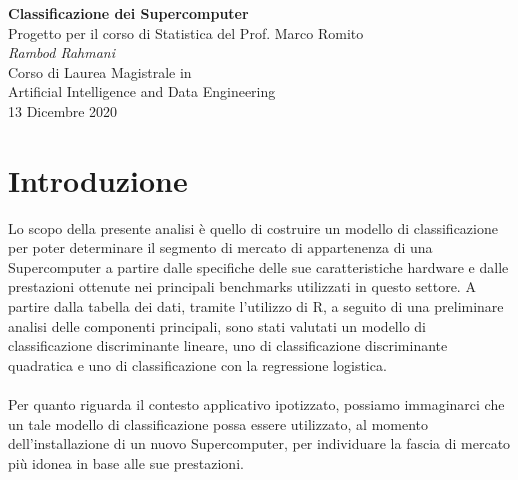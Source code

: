 \documentclass[11pt,a4paper]{article}
\begin{document}
\begin{center}
	\Large\textbf{Classificazione dei Supercomputer}\\
	\vspace{0.2cm}
	\large{Progetto per il corso di Statistica del Prof. Marco Romito}\\
	\vspace{0.5cm}
	\large\textit{Rambod Rahmani}\\
	\vspace{0.2cm}
	\scriptsize{Corso di Laurea Magistrale in\\Artificial Intelligence and
	Data Engineering}\\
	\vspace{0.5cm}
	\normalsize{13 Dicembre 2020}
\end{center}

\tableofcontents

\section{Introduzione}
Lo scopo della presente analisi \`e quello di costruire un modello di
classificazione per poter determinare il segmento di mercato di appartenenza di
una Supercomputer a partire dalle specifiche delle sue caratteristiche hardware
e dalle prestazioni ottenute nei principali benchmarks utilizzati in questo
settore.
A partire dalla tabella dei dati, tramite l'utilizzo di R, a seguito di una
preliminare analisi delle componenti principali, sono stati valutati un modello
di classificazione discriminante lineare, uno di classificazione discriminante
quadratica e uno di classificazione con la regressione logistica.\\
\\
Per quanto riguarda il contesto applicativo ipotizzato, possiamo immaginarci che
un tale modello di classificazione possa essere utilizzato, al momento
dell'installazione di un nuovo Supercomputer, per individuare la fascia di
mercato pi\`u idonea in base alle sue prestazioni.
\end{document}
